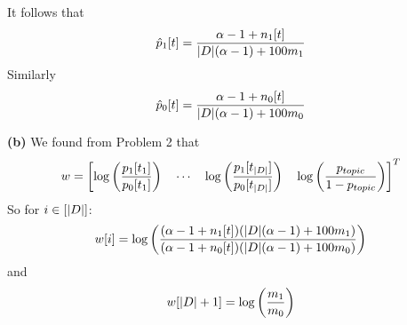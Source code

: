 \documentclass[a4paper, 11pt]{article}
\begin{document}
\begin{problem}
    It follows that \begin{equation*}
    \hat{p}_1[t] = \frac{\alpha - 1 + n_1[t]}{\lvert D\rvert(\alpha - 1) + 100m_1}
    \end{equation*}
    Similarly \begin{equation*}
    \hat{p}_0[t] = \frac{\alpha - 1 + n_0[t]}{ \lvert D\rvert(\alpha - 1) + 100m_0}
    \end{equation*}

    \textbf{(b)} We found from Problem 2 that 
    \begin{equation*}
        w = \left[ \log\left(\frac{p_1[t_1]}{p_0[t_1]}\right) \quad \cdots \quad \log\left(\frac{p_1[t_{\lvert D\rvert}]}{p_0[t_{\lvert D\rvert}]}\right) \quad \log \left(\frac{p_{topic}}{1 - p_{topic}}\right)\right]^T
        \end{equation*}
        So for $i \in [\lvert D\rvert]$:
        \begin{equation*}
        w[i] = \log\left(\frac{(\alpha - 1 + n_1[t])(\lvert D\rvert(\alpha - 1) + 100m_1)}{(\alpha - 1 + n_0[t])(\lvert D\rvert(\alpha - 1) + 100m_0)}\right)
        \end{equation*}
        and \begin{equation*}
        w[\lvert D\rvert + 1] = \log\left(\frac{m_1}{m_0}\right)
        \end{equation*}
\end{problem}
\end{document}
